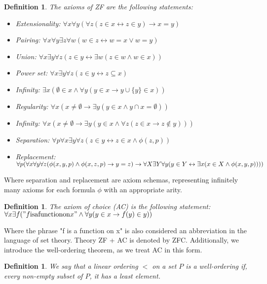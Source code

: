 \documentclass{report}
\newtheorem{dfn}[thm]{Definition}
\begin{document}
\begin{dfn}
  The axioms of ZF are the following statements:
  \begin{itemize}
    \item Extensionality: $\forall x \forall y (\forall z (z \in x \leftrightarrow z \in y) \rightarrow x = y)$
    \item Pairing: $\forall x \forall y \exists z \forall w (w \in z \leftrightarrow w = x \lor w = y)$
    \item Union: $\forall x \exists y \forall z (z \in y \leftrightarrow \exists w (z \in w \land w \in x))$
    \item Power set: $\forall x \exists y \forall z (z \in y \leftrightarrow z \subseteq x)$
    \item Infinity: $\exists x (\emptyset \in x \land \forall y (y \in x \rightarrow y \cup \{y\} \in x))$
    \item Regularity: $\forall x(x \neq \emptyset \rightarrow \exists y (y \in x \land y \cap x = \emptyset))$
    \item Infinity: $\forall x (x \neq \emptyset \rightarrow \exists y (y \in x \land \forall z (z \in x \rightarrow z \notin y)))$
    \item Separation: $\forall p \forall x \exists y \forall z (z \in y \leftrightarrow z \in x \land \phi(z, p))$
    \item Replacement: $\forall p (\forall x \forall y \forall z (\phi(x, y, p) \land \phi(x, z, p) \rightarrow y = z) \rightarrow \\ \forall X \exists Y \forall y (y \in Y \leftrightarrow \exists x (x \in X \land \phi(x, y, p))))$
  \end{itemize}
\end{dfn}
Where separation and replacement are axiom schemas, representing infinitely many axioms for each formula $\phi$ with an appropriate arity.
\begin{dfn} 
  \emph{The axiom of choice (AC)} is the following statement: \\
  $\forall x \exists f (\mathrm{"} f \mathrm{ is a function on } x \mathrm{"} \land \forall y (y \in x \rightarrow f(y) \in y))$
\end{dfn}
Where the phrase "f is a function on x" is also considered an abbreviation in the language of set theory.
Theory ZF + AC is denoted by ZFC.
Additionally, we introduce the well-ordering theorem, as we treat AC in this form.

\begin{dfn}
  We say that a linear ordering $<$ on a set $P$ is a \emph{well-ordering} if, every non-empty subset of $P$, it has a least element.
\end{dfn}
\end{document}
